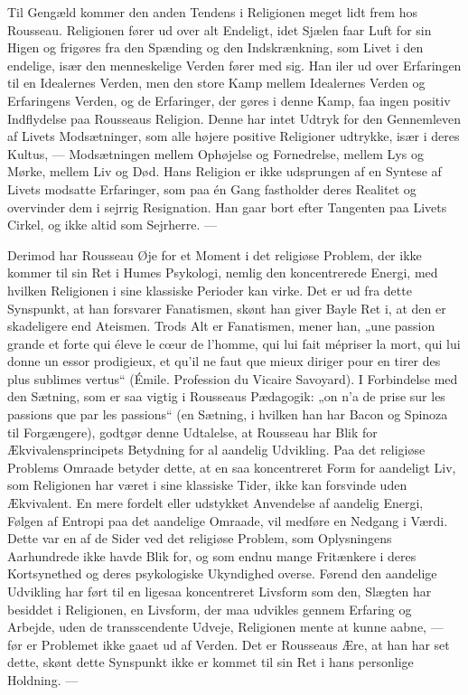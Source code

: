 \documentclass[12pt,a4paper,openany]{book}
\newcommand{\opage}[1]{\marginnote{\footnotesize\textit{[#1]}}}
\begin{document}
Til Gengæld kommer den anden Tendens i Religionen
meget lidt frem hos Rousseau. Religionen fører ud over alt
Endeligt, idet Sjælen faar Luft for sin Higen og frigøres fra den
Spænding og den Indskrænkning, som Livet i den endelige,
især den menneskelige Verden fører med sig. Han iler ud
over Erfaringen til en Idealernes Verden, men den store Kamp
mellem Idealernes Verden og Erfaringens Verden, og de Erfaringer,
der gøres i denne Kamp, faa ingen positiv Indflydelse
paa Rousseaus Religion. Denne har intet Udtryk for den Gennemleven
af Livets Modsætninger, som alle højere positive Religioner
udtrykke, især i deres Kultus, --- Modsætningen mellem
Ophøjelse og Fornedrelse, mellem Lys og Mørke, mellem Liv
og Død. Hans Religion er ikke udsprungen af en Syntese af
Livets modsatte Erfaringer, som paa én Gang fastholder deres
Realitet og overvinder dem i sejrrig Resignation. Han gaar
bort efter Tangenten paa Livets Cirkel, og ikke altid som Sejrherre. ---


Derimod har Rousseau Øje for et Moment i det religiøse
Problem, der ikke kommer til sin Ret i Humes Psykologi,
nemlig den koncentrerede Energi, med hvilken Religionen i
\setcounter{footnote}{0}%
\opage{161}sine klassiske Perioder kan virke. Det er ud fra dette Synspunkt,
at han forsvarer Fanatismen, skønt han giver Bayle Ret
i, at den er skadeligere end Ateismen. Trods Alt er Fanatismen,
mener han, „une passion grande et forte qui éleve le
cœur de l’homme, qui lui fait mépriser la mort, qui lui donne
un essor prodigieux, et qu’il ne faut que mieux diriger pour
en tirer des plus sublimes vertus“ (Émile. Profession du Vicaire
Savoyard). I Forbindelse med den Sætning, som er saa vigtig
i Rousseaus Pædagogik: „on n’a de prise sur les passions que
par les passions“ (en Sætning, i hvilken han har Bacon og
Spinoza til Forgængere), godtgør denne Udtalelse, at Rousseau
har Blik for Ækvivalensprincipets Betydning for al aandelig
Udvikling. Paa det religiøse Problems Omraade betyder dette,
at en saa koncentreret Form for aandeligt Liv, som Religionen
har været i sine klassiske Tider, ikke kan forsvinde uden
Ækvivalent. En mere fordelt eller udstykket Anvendelse af
aandelig Energi, Følgen af Entropi paa det aandelige Omraade,
vil medføre en Nedgang i Værdi. Dette var en af de Sider ved
det religiøse Problem, som Oplysningens Aarhundrede ikke
havde Blik for, og som endnu mange Fritænkere i deres Kortsynethed
og deres psykologiske Ukyndighed overse. Førend
den aandelige Udvikling har ført til en ligesaa koncentreret
Livsform som den, Slægten har besiddet i Religionen, en Livsform,
der maa udvikles gennem Erfaring og Arbejde, uden de
transscendente Udveje, Religionen mente at kunne aabne,
--- før er Problemet ikke gaaet ud af Verden. Det er Rousseaus
Ære, at han har set dette, skønt dette Synspunkt ikke er
kommet til sin Ret i hans personlige Holdning. ---
\end{document}
